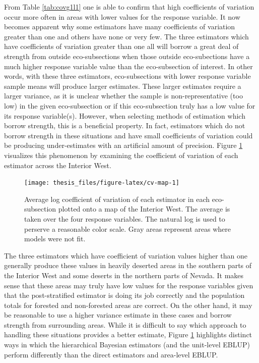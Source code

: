 \documentclass[12pt,twoside]{reedthesis}
\begin{document}
From Table \ref{tab:covg1l1} one is able to confirm that high coefficients of variation occur more often in areas with lower values for the response variable. It now becomes apparent why some estimators have many coefficients of variation greater than one and others have none or very few. The three estimators which have coefficients of variation greater than one all will borrow a great deal of strength from outside eco-subsections when those outside eco-subections have a much higher response variable value than the eco-subsection of interest. In other words, with these three estimators, eco-subsections with lower response variable sample means will produce larger estimates. These larger estimates require a larger variance, as it is unclear whether the sample is non-representative (too low) in the given eco-subsection or if this eco-subsection truly has a low value for its response variable(s). However, when selecting methods of estimation which borrow strength, this is a beneficial property. In fact, estimators which do not borrow strength in these situations and have small coefficients of variation could be producing under-estimates with an artificial amount of precision. Figure \ref{fig:cv-map} visualizes this phenomenon by examining the coefficient of variation of each estimator across the Interior West.
\clearpage
\begin{figure}

{\centering \texttt{[image: thesis\_files/figure-latex/cv-map-1]} 

}

\caption[Coefficient of variation map]{Average log coefficient of variation of each estimator in each eco-subsection plotted onto a map of the Interior West. The average is taken over the four response variables. The natural log is used to perserve a reasonable color scale. Gray areas represent areas where models were not fit.}\label{fig:cv-map}
\end{figure}
The three estimators which have coefficient of variation values higher than one generally produce these values in heavily deserted areas in the southern parts of the Interior West and some deserts in the northern parts of Nevada. It makes sense that these areas may truly have low values for the response variables given that the post-stratified estimator is doing its job correctly and the population totals for forested and non-forested areas are correct. On the other hand, it may be reasonable to use a higher variance estimate in these cases and borrow strength from surrounding areas. While it is difficult to say which approach to handling these situations provides a better estimate, Figure \ref{fig:cv-map} highlights distinct ways in which the hierarchical Bayesian estimators (and the unit-level EBLUP) perform differently than the direct estimators and area-level EBLUP.
\clearpage
\end{document}
